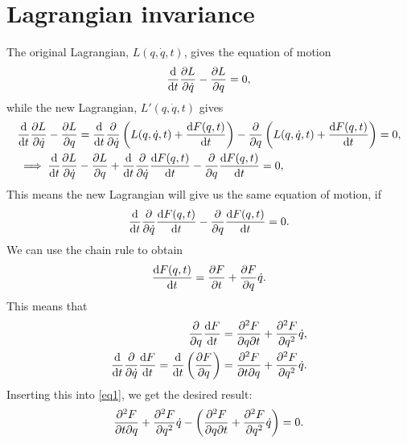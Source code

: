 \documentclass{article}
\begin{document}
        \section{Lagrangian invariance}
        The original Lagrangian, $L(q, \dot q, t)$, gives the equation of motion
        \begin{equation*}
            \dv{t} \pdv{L}{\dot q} - \pdv{L}{q} = 0,
        \end{equation*}
        while the new Lagrangian, $L'(q, \dot q, t)$ gives
        \begin{align*}
            &\dv{t} \pdv{L}{\dot q} - \pdv{L}{q} = 
            \dv{t}\pdv{\dot q} \left( L(q, \dot q, t) + \dv{F(q, t)}{t} \right) - \pdv{q} \left( L(q, \dot q, t) + \dv{F(q, t)}{t} \right) = 0, \\
            &\implies \dv{t} \pdv{L}{\dot q} - \pdv{L}{q} + \dv{t} \pdv{\dot q} \dv{F(q, t)}{t}  - \pdv{q} \dv{F(q, t)}{t} = 0,
        \end{align*}
        This means the new Lagrangian will give us the same equation of motion, if 
        \begin{equation}
            \dv{t} \pdv{\dot q} \dv{F(q, t)}{t}  - \pdv{q} \dv{F(q, t)}{t} = 0.
            \label{eq1}
        \end{equation}
        We can use the chain rule to obtain
        \begin{equation*}
            \dv{F(q, t)}{t} = \pdv{F}{t} + \pdv{F}{q} \dot q.
        \end{equation*}
        This means that
        \begin{align*}
            \pdv{q} \dv{F}{t} = \pdv{F}{q}{t} + \pdv[2]{F}{q} \dot q, \\
            \dv{t} \pdv{\dot q} \dv{F}{t} = \dv{t} \left(\pdv{F}{q}\right) = \pdv{F}{t}{q} + \pdv[2]{F}{q}\dot q.
        \end{align*}
        Inserting this into \eqref{eq1}, we get the desired result:
        \begin{equation*}
            \pdv{F}{t}{q} + \pdv[2]{F}{q}\dot q - \left(\pdv{F}{q}{t} + \pdv[2]{F}{q} \dot q \right) = 0.
        \end{equation*} 
\end{document}
